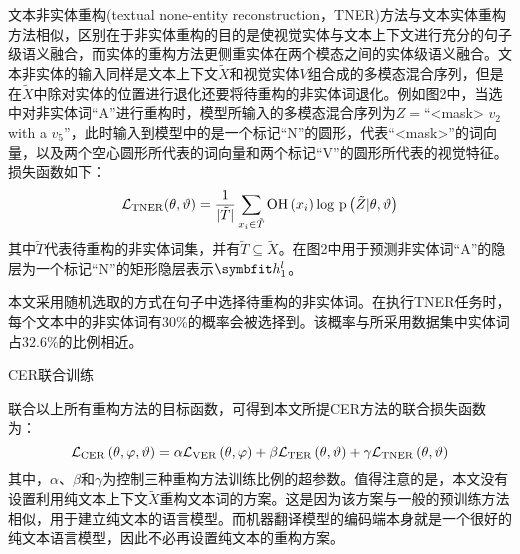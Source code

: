 
文本非实体重构(textual none-entity reconstruction，TNER)方法与文本实体重构方法相似，区别在于非实体重构的目的是使视觉实体与文本上下文进行充分的句子级语义融合，而实体的重构方法更侧重实体在两个模态之间的实体级语义融合。文本非实体的输入同样是文本上下文$\tilde{X}$和视觉实体$V$组合成的多模态混合序列，但是在$\tilde{X}$中除对实体的位置进行退化还要将待重构的非实体词退化。例如图2中，当选中对非实体词“A”进行重构时，模型所输入的多模态混合序列为$Z=$“<mask> $v_2$ with a $v_5$”，此时输入到模型中的是一个标记“N”的圆形，代表“<mask>”的词向量，以及两个空心圆形所代表的词向量和两个标记“V”的圆形所代表的视觉特征。损失函数如下：
\begin{equation}
\mathcal{L}_{\rm{TNER}}(\theta, \vartheta) =
    \frac{1}{{\vert}\tilde{T}{\vert}}
    \mathop{\sum}_{x_i \in \tilde{T}}
    {\rm{OH}} \left( x_i \right)
    {\rm log}{\ }{\rm p} \left( \tilde{Z} {\vert} \theta, \vartheta \right)
\end{equation}
其中$\tilde{T}$代表待重构的非实体词集，并有$\tilde{T}\subseteq \tilde{X}$。在图2中用于预测非实体词“A”的隐层为一个标记“N”的矩形隐层表示$\Vector{h_1^l}$。

本文采用随机选取的方式在句子中选择待重构的非实体词。在执行TNER任务时，每个文本中的非实体词有$30\%$的概率会被选择到。该概率与所采用数据集中实体词占$32.6\%$的比例相近。

{\sffamily CER联合训练}

联合以上所有重构方法的目标函数，可得到本文所提CER方法的联合损失函数为：
\begin{equation}
\mathcal{L}_{\rm{CER}} \left( \theta, \varphi, \vartheta \right) = \alpha \mathcal{L}_{\rm{VER}} \left( \theta, \varphi \right) + \beta \mathcal{L}_{\rm{TER}} \left( \theta, \vartheta \right) + \gamma \mathcal{L}_{\rm{TNER}} \left( \theta, \vartheta \right)
\label{eq:4_combined_cer}
\end{equation}
其中，$\alpha$、$\beta$和$\gamma$为控制三种重构方法训练比例的超参数。值得注意的是，本文没有设置利用纯文本上下文$\tilde{X}$重构文本词的方案。这是因为该方案与一般的预训练方法相似，用于建立纯文本的语言模型。而机器翻译模型的编码端本身就是一个很好的纯文本语言模型，因此不必再设置纯文本的重构方案。

